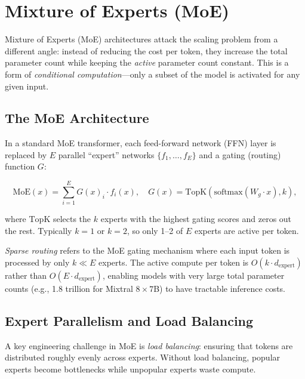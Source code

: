 \section{Mixture of Experts (MoE)}
\label{sec:moe}

Mixture of Experts (MoE) architectures attack the scaling problem from a different angle: instead of reducing the cost per token, they increase the total parameter count while keeping the \emph{active} parameter count constant. This is a form of \emph{conditional computation}---only a subset of the model is activated for any given input.

\subsection{The MoE Architecture}

In a standard MoE transformer, each feed-forward network (FFN) layer is replaced by $E$ parallel ``expert'' networks $\{f_1, \ldots, f_E\}$ and a gating (routing) function $G$:

\begin{equation}
\text{MoE}(x) = \sum_{i=1}^{E} G(x)_i \cdot f_i(x), \quad G(x) = \text{TopK}\!\left(\text{softmax}(W_g \cdot x), k\right),
\label{eq:moe}
\end{equation}

where $\text{TopK}$ selects the $k$ experts with the highest gating scores and zeros out the rest. Typically $k = 1$ or $k = 2$, so only 1--2 of $E$ experts are active per token.

\begin{definition}
\emph{Sparse routing} refers to the MoE gating mechanism where each input token is processed by only $k \ll E$ experts. The active compute per token is $O(k \cdot d_{\text{expert}})$ rather than $O(E \cdot d_{\text{expert}})$, enabling models with very large total parameter counts (e.g., 1.8 trillion for Mixtral $8 \times 7$B) to have tractable inference costs.
\end{definition}

\subsection{Expert Parallelism and Load Balancing}

A key engineering challenge in MoE is \emph{load balancing}: ensuring that tokens are distributed roughly evenly across experts. Without load balancing, popular experts become bottlenecks while unpopular experts waste compute.

